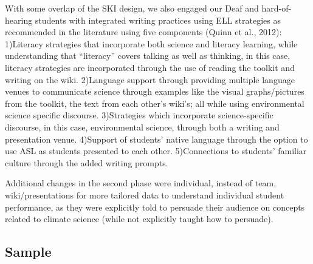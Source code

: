 \documentclass[11.5pt]{sig-alternate} %
\begin{document}
\begin{large}
With some overlap of the SKI design, we also engaged our Deaf and hard-of-hearing students with integrated writing practices using ELL strategies as recommended in the literature using five components (Quinn et al., 2012): 1)Literacy strategies that incorporate both science and literacy learning, while understanding that “literacy” covers talking as well as thinking, in this case, literacy strategies are incorporated through the use of reading the toolkit and writing on the wiki. 2)Language support through providing multiple language venues to communicate science through examples like the visual graphs/pictures from the toolkit, the text from each other’s wiki’s; all while using environmental science specific discourse. 3)Strategies which incorporate science-specific discourse, in this case, environmental science, through both a writing and presentation venue. 4)Support of students’ native language through the option to use ASL as students presented to each other. 5)Connections to students’ familiar culture through the added writing prompts.

Additional changes in the second phase were individual, instead of team, wiki/presentations for more tailored data to understand individual student performance, as they were explicitly told to persuade their audience on concepts related to climate science (while not explicitly taught how to persuade). 

\subsection*{Sample}


\end{large}
\end{document}
